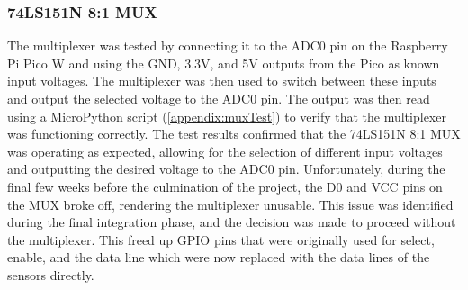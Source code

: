 \documentclass[12pt]{article} %
\begin{document}
\subsubsection{74LS151N 8:1 MUX}
\noindent The multiplexer \cite{ref_mux} was tested by connecting it to the ADC0 pin on the Raspberry Pi Pico W and using the GND, 3.3V, and 5V outputs from the Pico as known input voltages. The multiplexer was then used to switch between these inputs and output the selected voltage to the ADC0 pin. The output was then read using a MicroPython script (\ref{appendix:muxTest}) to verify that the multiplexer was functioning correctly. The test results confirmed that the 74LS151N 8:1 MUX was operating as expected, allowing for the selection of different input voltages and outputting the desired voltage to the ADC0 pin.
\newline
\newline
\noindent Unfortunately, during the final few weeks before the culmination of the project, the D0 and VCC pins on the MUX broke off, rendering the multiplexer unusable. This issue was identified during the final integration phase, and the decision was made to proceed without the multiplexer. This freed up GPIO pins that were originally used for select, enable, and the data line which were now replaced with the data lines of the sensors directly. 

\pagebreak
\end{document}
